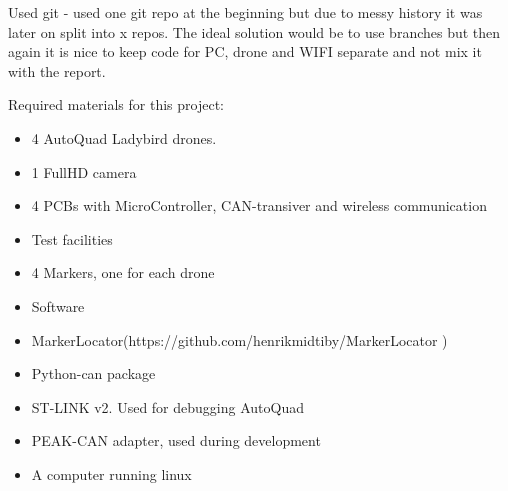 Used git - used one git repo at the beginning but due to messy history it was later on split into x repos. The ideal solution would be to use branches but then again it is nice to keep code for PC, drone and WIFI separate and not mix it with the report.

Required materials for this project:

\begin{itemize}
	\item 4 AutoQuad Ladybird drones. 
	\item 1 FullHD camera
	\item 4 PCBs with MicroController, CAN-transiver and wireless communication
	\item Test facilities
	\item 4 Markers, one for each drone
	\item Software
	\item MarkerLocator(https://github.com/henrikmidtiby/MarkerLocator )
	\item Python-can package
	\item ST-LINK v2. Used for debugging AutoQuad
	\item PEAK-CAN adapter, used during development
	\item A computer running linux
\end{itemize}

